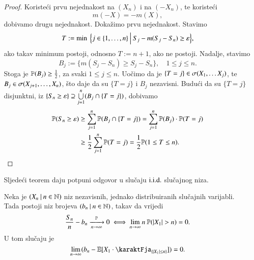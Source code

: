 \begin{proof}
    Koriste\' ci prvu nejednakost na $(X_n)$ i na $(-X_n)$, te koriste\' ci
    \begin{equation*}
        m(-X) = -m(X),    
    \end{equation*}
    dobivamo drugu nejednakost.
    Doka\v zimo prvu nejednakost.
    Stavimo
    \begin{equation*}
        T:= \min \: \Big\{ {j \in \{1, \ldots, n\}} \: \Big| \: {S_j - m(S_j - S_n) \geq \varepsilon} \Big\} ,
    \end{equation*}
    ako takav minimum postoji, odnosno $T:= n + 1$, ako ne postoji.
    Nadalje, stavimo
    \begin{equation*}
        B_j := \Big\{ m(S_j - S_n) \geq S_j - S_n \Big\}, \quad 1 \leq j \leq n.
    \end{equation*}
    Stoga je $\mathbb{P}({B_j}) \geq \frac{1}{2}$, za svaki $1 \leq j \leq n$.
    Uo\v cimo da je $\{ T = j \} \in \sigma({X_1, \ldots X_j})$, te $B_j \in \sigma({X_{j + 1}, \ldots, X_n})$, \v sto daje da su $\{T = j\}$ i $B_j$ nezavisni.
    Budu\' ci da su $\{T = j\}$ disjunktni, iz $\{ S_n \geq \varepsilon \} \supseteq \bigcup\limits_{j = 1}^{n} (B_j \cap \{ T = j \})$, dobivamo
    \begin{equation*}
        \begin{aligned}
            \mathbb{P}({S_n \geq \varepsilon}) &\geq \sum\limits_{j = 1}^{n} \mathbb{P}({B_j \cap \{ T = j \}}) = \sum\limits_{j = 1}^{n} \mathbb{P}({B_j}) \cdot \mathbb{P}({T = j})\\
            &\geq \frac{1}{2} \sum\limits_{j = 1}^{n} \mathbb{P}({T = j}) = \frac{1}{2} \mathbb{P}({1 \leq T \leq n}).
        \end{aligned}
    \end{equation*}
\end{proof}

Sljede\' ci teorem daju potpuni odgovor u slu\v caju $\mathrm{i.i.d.}$ slu\v cajnog niza.

\begin{tm}[W. Feller]   \label{tm:12.9}
    Neka je $({X_n} \: | \: {n \in \mathbb{N}})$ niz nezavisnih, jednako distribuiranih slu\v cajnih varijabli.
    Tada postoji niz brojeva $({b_n} \: | \: {n \in \mathbb{N}})$, takav da vrijedi
    \begin{equation*}
        \frac{S_n}{n} - b_n \xrightarrow[n \to \infty]{\mathbb{P}} 0 \iff \lim\limits_{n \to \infty} n \: \mathbb{P}({|X_1| > n}) = 0.
    \end{equation*}
    U tom slu\v caju je
    \begin{equation*}
        \lim\limits_{n \to \infty} (b_n - \masE [ X_1 \cdot \karaktFja_{\{ |X_1| \leq n \}}]) = 0.
    \end{equation*}
\end{tm}

